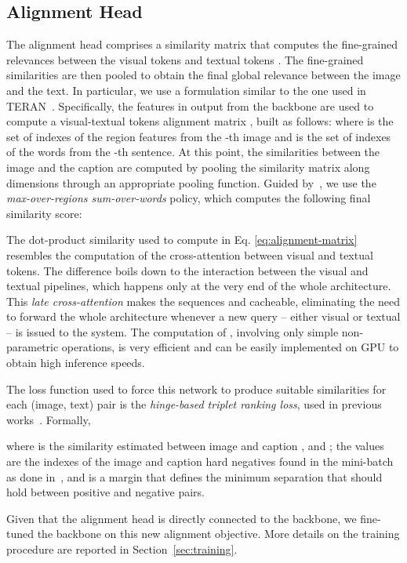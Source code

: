 \documentclass[sigconf]{acmart}
\begin{document}
\subsection{Alignment Head}
The alignment head comprises a similarity matrix that computes the fine-grained relevances between the visual tokens  and textual tokens . The fine-grained similarities are then pooled to obtain the final global relevance between the image and the text. In particular, we use a formulation similar to the one used in TERAN~\citep{messina2021fine}.
Specifically, the features in output from the backbone are used to compute a visual-textual tokens alignment matrix , built as follows: 
where  is the set of indexes of the region features from the -th image and  is the set of indexes of the words from the -th sentence. At this point, the similarities  between the image  and the caption  are computed by pooling the similarity matrix  along dimensions  through an appropriate pooling function. Guided by~\citep{messina2021fine}, we use the \textit{max-over-regions sum-over-words} policy, which computes the following final similarity score:



The dot-product similarity used to compute  in Eq. \ref{eq:alignment-matrix} resembles the computation of the cross-attention between visual and textual tokens. The difference boils down to the interaction between the visual and textual pipelines, which happens only at the very end of the whole architecture. This \textit{late cross-attention} makes the sequences  and  cacheable, eliminating the need to forward the whole architecture whenever a new query -- either visual or textual -- is issued to the system. The computation of , involving only simple non-parametric operations, is very efficient and can be easily implemented on GPU to obtain high inference speeds.

The loss function used to force this network to produce suitable similarities  for each (image, text) pair is the \textit{hinge-based triplet ranking loss}, used in previous works~\citep{vsepp2018faghri,li2019,messina2021fine}. Formally,

where  is the similarity estimated between image  and caption , and ; the values  are the indexes of the image and caption hard negatives found in the mini-batch as done in~\citep{vsepp2018faghri}, and  is a margin that defines the minimum separation that should hold between positive and negative pairs.

Given that the alignment head is directly connected to the backbone, we fine-tuned the backbone on this new alignment objective. More details on the training procedure are reported in Section~\ref{sec:training}.
\end{document}
